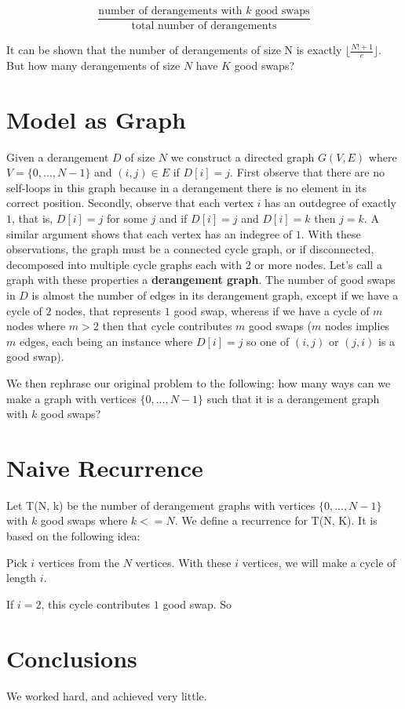 \documentclass[12pt]{article}
\begin{document}
\[ \frac{\text{number of derangements with $k$ good swaps}}{\text{total number of derangements}} \]

It can be shown that the number of derangements of size N is exactly $\lfloor \frac{N! + 1}{e} \rfloor$.
But how many derangements of size $N$ have $K$ good swaps?


\section{Model as Graph}
Given a derangement $D$ of size $N$ we construct a directed graph $G(V, E)$ where $V = \{0, ..., N - 1\}$
and $(i, j) \in E$ if $D[i] = j$. First observe that there are no self-loops in this graph because in 
a derangement there is no element in its correct position. Secondly, observe that each vertex $i$ has an outdegree
of exactly $1$, that is, $D[i] = j$ for some $j$ and if $D[i] = j$ and $D[i] = k$ then $j = k$. A similar argument shows that each
vertex has an indegree of $1$. With these observations, the graph must be a connected cycle graph, or if
disconnected, decomposed into multiple cycle graphs each with 2 or more nodes.
Let's call a graph with these properties a \textbf{derangement graph}.
The number of good swaps in $D$ is almost the number of edges in its derangement graph, except if we have a cycle of $2$ nodes,
that represents $1$ good swap, whereas if we have a cycle of $m$ nodes where $m > 2$ then that cycle contributes
$m$ good swaps ($m$ nodes implies $m$ edges, each being an instance where $D[i] = j$ so one of $(i, j)$ or 
$(j, i)$ is a good swap).

We then rephrase our original problem to the following: how many ways can we make a graph with
vertices $\{0, ..., N - 1\}$ such that it is a derangement graph with $k$ good swaps?

\section{Naive Recurrence}
Let T(N, k) be the number of derangement graphs with vertices $\{0, ..., N - 1\}$ with $k$ good swaps where
$k <= N$.
We define a recurrence for T(N, K). It is based on the following idea:

Pick $i$ vertices from the $N$ vertices. With these $i$ vertices, we will make a cycle of length $i$.

If $i = 2$, this cycle contributes $1$ good swap. So 



\section{Conclusions}\label{conclusions}
We worked hard, and achieved very little.



\end{document}
